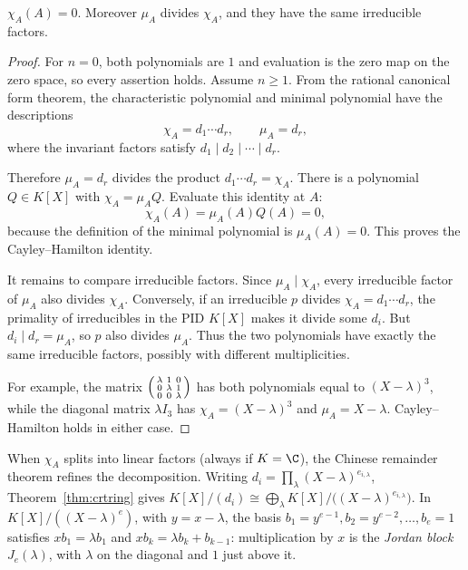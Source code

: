 \begin{corollary}\label{cor:cayleyhamilton}
$\chi_A(A)=0$. Moreover $\mu_A$ divides $\chi_A$, and they have the same irreducible factors.
\end{corollary}
\begin{proof}
For $n=0$, both polynomials are $1$ and evaluation is the zero map
on the zero space, so every assertion holds. Assume $n\ge1$.
From the rational canonical form theorem,
the characteristic polynomial and minimal
polynomial have the descriptions
\[
\chi_A=d_1\cdots d_r,\qquad
\mu_A=d_r,
\]
where the invariant factors satisfy
$d_1\mid d_2\mid\cdots\mid d_r$.

Therefore $\mu_A=d_r$ divides the
product $d_1\cdots d_r=\chi_A$.
There is a polynomial $Q\in K[X]$
with $\chi_A=\mu_A Q$.
Evaluate this identity at $A$:
\[
\chi_A(A)=\mu_A(A)Q(A)=0,
\]
because the definition of the minimal
polynomial is $\mu_A(A)=0$.
This proves the Cayley--Hamilton identity.

It remains to compare irreducible factors.
Since $\mu_A\mid\chi_A$, every
irreducible factor of $\mu_A$ also
divides $\chi_A$. Conversely, if an
irreducible $p$ divides $\chi_A=d_1\cdots d_r$,
the primality of irreducibles in the
PID $K[X]$ makes it divide some $d_i$.
But $d_i\mid d_r=\mu_A$, so $p$
also divides $\mu_A$.
Thus the two polynomials have exactly
the same irreducible factors,
possibly with different multiplicities.

For example, the matrix $\begin{psmallmatrix}\lambda&1&0\\0&\lambda&1\\0&0&\lambda\end{psmallmatrix}$ has both polynomials
equal to $(X-\lambda)^3$, while the
diagonal matrix $\lambda I_3$ has
$\chi_A=(X-\lambda)^3$ and
$\mu_A=X-\lambda$. Cayley--Hamilton
holds in either case.
\end{proof}

When $\chi_A$ splits into linear factors (always if $K=\C$), the Chinese remainder theorem refines the decomposition. Writing $d_i=\prod_\lambda(X-\lambda)^{e_{i,\lambda}}$, Theorem~\ref{thm:crtring} gives $K[X]/(d_i)\cong\bigoplus_\lambda K[X]/\bigl((X-\lambda)^{e_{i,\lambda}}\bigr)$. In $K[X]/((X-\lambda)^e)$, with $y=x-\lambda$, the basis $b_1=y^{e-1},b_2=y^{e-2},\dots,b_e=1$ satisfies $xb_1=\lambda b_1$ and $xb_k=\lambda b_k+b_{k-1}$: multiplication by $x$ is the \emph{Jordan block} $J_e(\lambda)$, with $\lambda$ on the diagonal and $1$ just above it.

